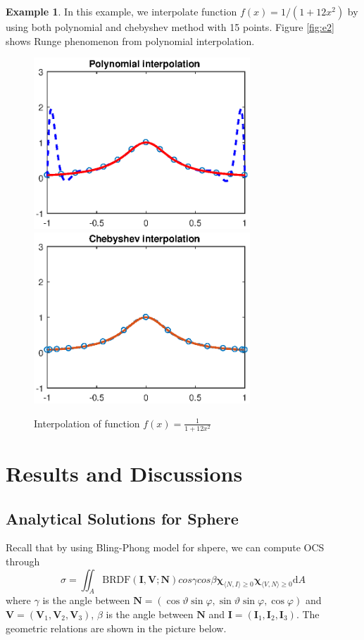\documentclass[11pt]{amsart}
\newcommand{\BRDF}{\mathrm{BRDF}}
\newcommand{\ip}[2]{\langle {#1}, {#2} \rangle}
\theoremstyle{definition}
\newtheorem{exmp}{Example}[section]
\begin{document}
\begin{exmp}
In this example, we interpolate function $f(x)=1/(1+12x^2)$ by using both polynomial and chebyshev method with 15 points. Figure \eqref{fig:e2} shows Runge phenomenon from polynomial interpolation.
\begin{figure}  [H]   	
        \centerline{\includegraphics[width=3.2in]{./figs/e2a.eps}
      	\hspace{-6pt}
     	\includegraphics[width=3.2in]{./figs/e2b.eps}}
     	\hspace{-6pt}
		\caption{Interpolation of function $f(x)=\frac{1}{1+12x^2}$}
        \label{fig:e2}
\end{figure}
\end{exmp}

\section{Results and Discussions}
\subsection{Analytical Solutions for Sphere}
Recall that by using Bling-Phong model for shpere, we can compute OCS through
$$\sigma =\iint_{A}\BRDF(\mathbf{I},\mathbf{V};\mathbf{N}) cos\gamma cos\beta \mathbf{\chi}_{\ip{N}{I}\geq 0}\mathbf{\chi}_{\ip{V}{N}\geq 0}\mathrm{d}A$$
where $\gamma$ is the angle between $\mathbf{N}=(\cos\vartheta\sin\varphi,\sin\vartheta\sin\varphi,\cos\varphi)$ and  $\mathbf{V}=(\mathbf{V}_1,\mathbf{V}_2,\mathbf{V}_3)$,  $\beta$ is the angle between $\mathbf{N}$ and $\mathbf{I}=(\mathbf{I}_1,\mathbf{I}_2,\mathbf{I}_3)$. The geometric relations are shown in the picture below.
\end{document}
